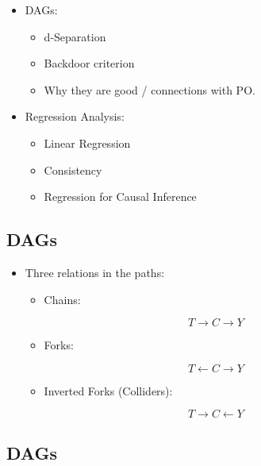 \documentclass[11pt]{article}
\providecommand{\tightlist}{%
      \setlength{\itemsep}{0pt}\setlength{\parskip}{0pt}}
\begin{document}
\begin{itemize}
\tightlist
\item
  DAGs:

  \begin{itemize}
  \tightlist
  \item
    d-Separation
  \item
    Backdoor criterion
  \item
    Why they are good / connections with PO.
  \end{itemize}
\item
  Regression Analysis:

  \begin{itemize}
  \tightlist
  \item
    Linear Regression
  \item
    Consistency
  \item
    Regression for Causal Inference
  \end{itemize}
\end{itemize}

    \hypertarget{dags}{%
\subsection{DAGs}\label{dags}}

\begin{itemize}
\item
  Three relations in the paths:

  \begin{itemize}
  \tightlist
  \item
    Chains:
  \end{itemize}

  \[T \longrightarrow C \longrightarrow Y\]

  \begin{itemize}
  \tightlist
  \item
    Forks:
  \end{itemize}

  \[T \longleftarrow C \longrightarrow Y\]

  \begin{itemize}
  \tightlist
  \item
    Inverted Forks (Colliders):
  \end{itemize}

  \[T \longrightarrow C \longleftarrow Y\]
\end{itemize}

    \hypertarget{dags}{%
\subsection{DAGs}\label{dags}}
\end{document}
